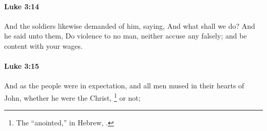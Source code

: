 		\paragraph{Luke 3:14} %
			\label{LUKE-3-14}

			And the soldiers likewise demanded of him, saying, And what shall we do? And he said unto them, Do violence to no man, neither accuse any falsely; and be content with your wages.

			\begin{framed}
			\scriptsize
				\begin{compactdesc}
					\item[SBLG] 
				\end{compactdesc}
			\end{framed}

		\paragraph{Luke 3:15} %
			\label{LUKE-3-15}

			And as the people were in expectation, and all men mused in their hearts of John, whether he were the Christ,%
				\footnote{%
					The ``anointed,'' in Hebrew, \hyperref[MASHIACH]{}.
					}
			or not;

